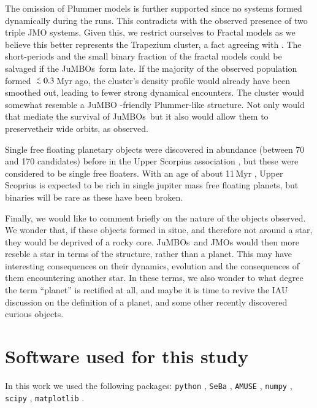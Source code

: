 \documentclass[submission,phys]{lib/SciPost}
\def\aplt{\ {\raise-.5ex\hbox{$\buildrel<\over\sim$}}\ }
\newcommand{\jumbo}{\mbox{JuMBO}}
\newcommand{\jumbos}{\mbox{JuMBOs}}
\begin{document}
The omission of Plummer models is further supported since no systems
formed dynamically during the runs. This contradicts with the observed
presence of two triple JMO systems. Given this, we restrict ourselves
to Fractal models as we believe this better represents the Trapezium
cluster, a fact agreeing with \cite{2016MNRAS.457..313P}.  The
short-periods and the small binary fraction of the fractal models
could be salvaged if the \jumbos\, form late. If the majority of the
observed population formed $\aplt 0.3$\,Myr ago, the cluster's density
profile would already have been smoothed out, leading to fewer strong
dynamical encounters. The cluster would somewhat resemble a \jumbo
-friendly Plummer-like structure. Not only would that mediate the
survival of \jumbos\, but it also would allow them to preservetheir
wide orbits, as observed.

Single free floating planetary objects were discovered in abundance
(between 70 and 170 candidates) before in the Upper Scorpius
association \cite{2022NatAs...6...89M}, but these were considered to
be single free floaters.  With an age of about 11\,Myr
\cite{2022NatAs...6...89M}, Upper Scoprius is expected to be rich in
single jupiter mass free floating planets, but binaries will be rare
as these have been broken.

Finally, we would like to comment briefly on the nature of the objects
observed. We wonder that, if these objects formed in situe, and
therefore not around a star, they would be deprived of a rocky core.
\jumbos\, and JMOs would then more reseble a star in terms of the
structure, rather than a planet. This may have interesting
consequences on their dynamics, evolution and the consequences of them
encountering another star. In these terms, we also wonder to what
degree the term ``planet'' is rectified at all, and maybe it is time
to revive the IAU discussion on the definition of a planet, and some
other recently discovered curious objects.

\section*{Software used for this study}

In this work we used the following packages: \texttt{python}
\cite{10.5555/1593511}, \texttt{SeBa} \cite{1996A&A...309..179P,
  2012A&A...546A..70T}, \texttt{AMUSE} \cite{2018araa.book.....P},
\texttt{numpy} \cite{Oliphant2006ANumPy}, \texttt{scipy}
\cite{2020SciPy-NMeth}, \texttt{matplotlib}
\cite{2007CSE.....9...90H}.
\end{document}
